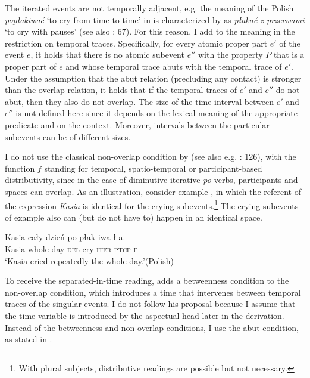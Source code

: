 \documentclass[output=paper,colorlinks,citecolor=brown]{langscibook}
\begin{document}
The iterated events are not temporally adjacent, e.g. the meaning of the Polish \textit{popłakiwać} ‘to cry from time to time’ in  is characterized by \citet{Żmigrodzki2022} as \textit{płakać z przerwami} ‘to cry with pauses’ (see also \citealt{Katny1994}: 67). For this reason, I add to the meaning in  the restriction on temporal traces. Specifically, for every atomic proper part $e'$ of the event $e$, it holds that there is no atomic subevent $e''$ with the property $P$ that is a proper part of $e$ and whose temporal trace abuts with the temporal trace of $e'$. Under the assumption that the abut relation (precluding any contact) is stronger than the overlap relation, it holds that if the temporal traces of $e'$ and $e''$ do not abut, then they also do not overlap. The size of the time interval between $e'$ and $e''$ is not defined here since it depends on the lexical meaning of the appropriate predicate and on the context. Moreover, intervals between the particular subevents can be of different sizes.

I do not use the classical non-overlap condition by \citet[256]{Lasersohn1995} (see also e.g. \citealt{Wood2007}: 126), with the function $f$ standing for temporal, spatio-temporal or participant-based distributivity, since in the case of diminutive-itera\-tive \textit{po-}verbs, participants and spaces can overlap. As an illustration, consider example , in which the referent of the expression \textit{Kasia} is identical for the crying subevents.\footnote{With plural subjects, distributive readings are possible but not necessary.} The crying subevents of example  also can (but do not have to) happen in an identical space.

\ea\label{biskup:ex:polish}\gll Kasia cały dzień po-płak-iwa-ł-a.\\
Kasia whole day \textsc{del}-cry-\textsc{iter-ptcp-f}\\
\glt ‘Kasia cried repeatedly the whole day.’\hfill (Polish)
\z

\noindent To receive the separated-in-time reading, \citet[254]{Lasersohn1995} adds a betweenness condition to the non-overlap condition, which introduces a time that intervenes between temporal traces of the singular events. I do not follow his proposal because I assume that the time variable is introduced by the aspectual head later in the derivation. Instead of the betweenness and non-overlap conditions, I use the abut condition, as stated in .
\end{document}
